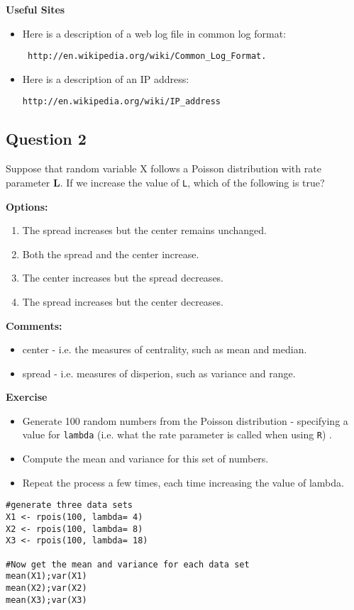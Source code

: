 \documentclass[]{article}
\begin{document}
{
\small
\noindent \textbf{Useful Sites}
\begin{itemize}
\item Here is a description of a web log file in common log format:
\begin{verbatim}
 http://en.wikipedia.org/wiki/Common_Log_Format. 
\end{verbatim}
\item Here is a description of an IP address:
\begin{verbatim}
http://en.wikipedia.org/wiki/IP_address
\end{verbatim}
\end{itemize}
}
\newpage
\subsection*{Question 2}
Suppose that random variable X follows a Poisson distribution with rate parameter \textbf{L}. If we increase the value of \texttt{L}, which of the following is true?


\bigskip
\noindent\textbf{Options:}
\begin{enumerate}
\item The spread increases but the center remains unchanged.
\item Both the spread and the center increase.
\item The center increases but the spread decreases.
\item The spread increases but the center decreases.
\end{enumerate}
\vspace{0.5cm}
\noindent \textbf{Comments:}
\begin{itemize}
\item center - i.e. the measures of centrality, such as mean and median.
\item spread - i.e. measures of disperion, such as variance and range.
\end{itemize} 

\vspace{0.5cm}
\noindent \textbf{Exercise}
\begin{itemize}
\item Generate 100 random numbers from the Poisson distribution - specifying a value for \texttt{lambda} (i.e. what the rate parameter is called when using \texttt{R}) .
\item Compute the mean and variance for this set of numbers.
\item Repeat the process a few times, each time increasing the value of lambda.
\end{itemize}
\begin{framed}
\begin{verbatim}
#generate three data sets
X1 <- rpois(100, lambda= 4)
X2 <- rpois(100, lambda= 8)
X3 <- rpois(100, lambda= 18)

#Now get the mean and variance for each data set
mean(X1);var(X1)
mean(X2);var(X2)
mean(X3);var(X3)
\end{verbatim}
\end{framed}
\end{document}
